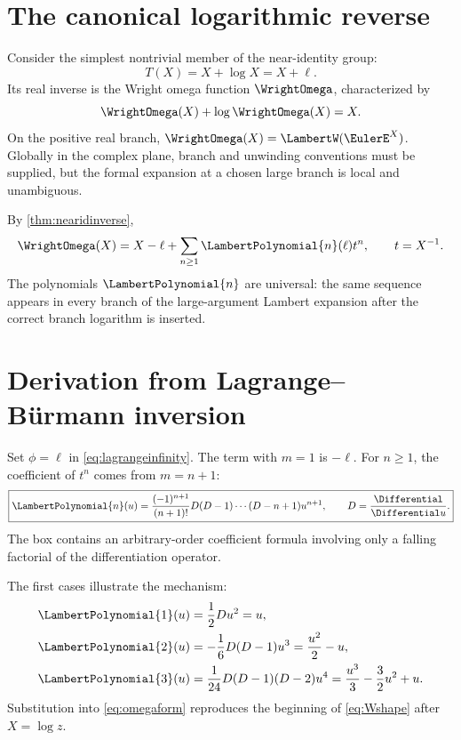 \documentclass[11pt,oneside,openany]{book}
\begin{document}
\section{The canonical logarithmic reverse}
Consider the simplest nontrivial member of the near-identity group:
\begin{equation}\label{eq:Tomega}
 T(X)=X+\log X=X+\ell.
\end{equation}
Its real inverse is the Wright omega function \(\WrightOmega\), characterized by
\begin{equation}\label{eq:omegadef}
 \WrightOmega(X)+\log\WrightOmega(X)=X.
\end{equation}
On the positive real branch,
\(\WrightOmega(X)=\LambertW(\EulerE^X)\).  Globally in the complex plane, branch and
unwinding conventions must be supplied, but the formal expansion at a chosen
large branch is local and unambiguous.

By \cref{thm:nearidinverse},
\begin{equation}\label{eq:omegaform}
 \WrightOmega(X)=X-\ell+\sum_{n\geq1}\LambertPolynomial{n}(\ell)t^n,
 \qquad t=X^{-1}.
\end{equation}
The polynomials \(\LambertPolynomial{n}\) are universal: the same sequence appears in every
branch of the large-argument Lambert expansion after the correct branch
logarithm is inserted.

\section{Derivation from Lagrange--Bürmann inversion}
Set \(\phi=\ell\) in \cref{eq:lagrangeinfinity}.  The term with \(m=1\) is
\(-\ell\).  For \(n\geq1\), the coefficient of \(t^n\) comes from \(m=n+1\):
\begin{equation}\label{eq:Poperator}
 \boxed{
 \LambertPolynomial{n}(u)=\frac{(-1)^{n+1}}{(n+1)!}
 D(D-1)\cdots(D-n+1)u^{n+1},
 \qquad D=\frac{\Differential}{\Differential u}.
 }
\end{equation}
The box contains an arbitrary-order coefficient formula involving only a
falling factorial of the differentiation operator.

The first cases illustrate the mechanism:
\begin{align*}
 \LambertPolynomial{1}(u)
 &=\frac12Du^2=u,\\
 \LambertPolynomial{2}(u)
 &=-\frac16D(D-1)u^3
   =\frac{u^2}{2}-u,\\
 \LambertPolynomial{3}(u)
 &=\frac1{24}D(D-1)(D-2)u^4
   =\frac{u^3}{3}-\frac32u^2+u.
\end{align*}
Substitution into \cref{eq:omegaform} reproduces the beginning of
\cref{eq:Wshape} after \(X=\log z\).
\end{document}
